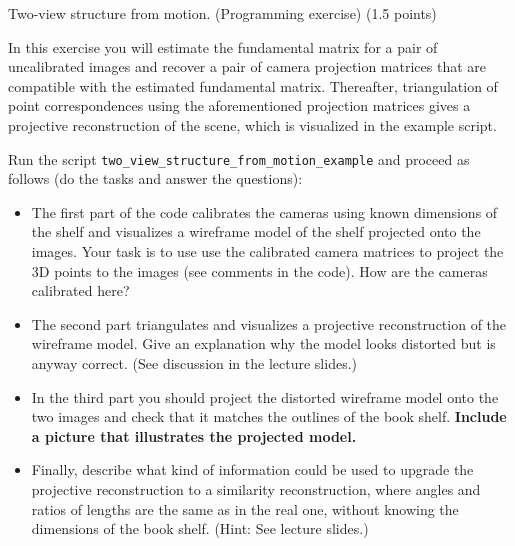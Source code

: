 \documentclass[12pt]{article} %
\newenvironment{exercise}[2][Task]{\begin{trivlist}
\item[\hskip \labelsep {\bfseries #1}\hskip \labelsep {\bfseries #2.}]}{\end{trivlist}}
\begin{document}
\begin{exercise}{3}
	Two-view structure from motion. (Programming exercise) (1.5 points)
	
	\vspace{1mm}
	\noindent In this exercise you will estimate the fundamental matrix for a pair of uncalibrated images and recover a pair of camera projection matrices that are compatible with the estimated fundamental matrix. Thereafter, triangulation of point correspondences using the aforementioned projection matrices gives a projective reconstruction of the scene, which is visualized in the example script.
	
	\vspace{1mm}
	\noindent Run the script \texttt{two\_view\_structure\_from\_motion\_example} and proceed as follows (do the tasks and answer the questions):
	\begin{itemize}
		\item[\textit{a)}] The first part of the code calibrates the cameras using known dimensions of the shelf and visualizes a wireframe model of the shelf projected onto the images. Your task is to use use the calibrated camera matrices to project the 3D points to the images (see comments in the code). How are the cameras calibrated here?
		
		\item[\textit{b)}] The second part triangulates and visualizes a projective reconstruction of the wireframe model. Give an explanation why the model looks distorted but is anyway correct. (See discussion in the lecture slides.)
		\item[\textit{c)}] In the third part you should project the distorted wireframe model onto the two images and check that it matches the outlines of the book shelf. \textbf{Include a picture that illustrates the projected model.}
		
		\item[\textit{d)}] Finally, describe what kind of information could be used to upgrade the projective reconstruction to a similarity reconstruction, where angles and ratios of lengths are the same as in the real one, without knowing the dimensions of the book shelf. (Hint: See lecture slides.)
	\end{itemize}
\end{exercise}
\end{document}
